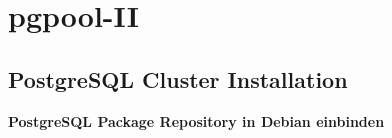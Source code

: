 
\section{pgpool-II}
\subsection{\Gls{PostgreSQL Cluster} Installation}
\textbf{\Gls{PostgreSQL} Package Repository in Debian einbinden}

